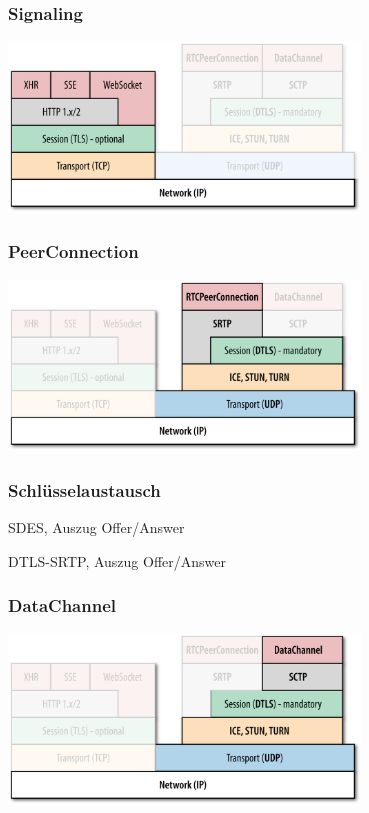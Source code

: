 \documentclass[12pt]{beamer}
\begin{document}
\begin{frame}
  \frametitle{Signaling}
  \centerline{\includegraphics[width=0.7\textwidth]{img/stack_oreilly_signaling.png}}
\end{frame}

\begin{frame}
  \frametitle{PeerConnection}
  \centerline{\includegraphics[width=0.7\textwidth]{img/stack_oreilly_pc.png}}
\end{frame}

\begin{frame}
  \frametitle{Schlüsselaustausch}
  \pause
  
  \hfill \tiny SDES, Auszug Offer/Answer
  \vspace{15pt} \\
  \pause
  
  \hfill \tiny DTLS-SRTP, Auszug Offer/Answer
\end{frame}

\begin{frame}
  \frametitle{DataChannel}
  \centerline{\includegraphics[width=0.7\textwidth]{img/stack_oreilly_datachannels.png}}
\end{frame}
\end{document}
